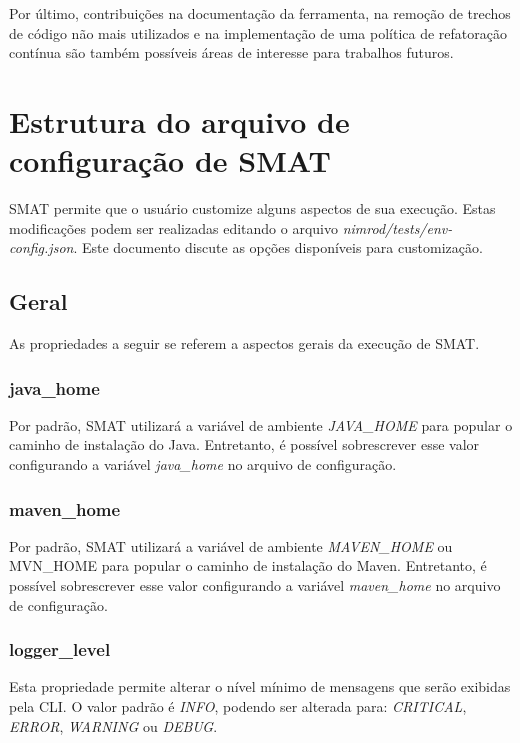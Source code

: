 \documentclass[12pt]{article}
\begin{document}
Por último, contribuições na documentação da ferramenta, na remoção de trechos de código não mais utilizados e na implementação de uma política de refatoração contínua são também possíveis áreas de interesse para trabalhos futuros.




\newpage

\appendix
\section{Estrutura do arquivo de configuração de SMAT} \label{apendice-a}
SMAT permite que o usuário customize alguns aspectos de sua execução. Estas modificações podem ser realizadas editando o arquivo \textit{nimrod/tests/env-config.json}. Este documento discute as opções disponíveis para customização.

\subsection{Geral}
As propriedades a seguir se referem a aspectos gerais da execução de SMAT.

\subsubsection{java\_home}
Por padrão, SMAT utilizará a variável de ambiente \textit{JAVA\_HOME} para popular o caminho de instalação do Java. Entretanto, é possível sobrescrever esse valor configurando a variável \textit{java\_home} no arquivo de configuração.

\subsubsection{maven\_home}
Por padrão, SMAT utilizará a variável de ambiente \textit{MAVEN\_HOME} ou MVN\_HOME para popular o caminho de instalação do Maven. Entretanto, é possível sobrescrever esse valor configurando a variável \textit{maven\_home} no arquivo de configuração.

\subsubsection{logger\_level}
Esta propriedade permite alterar o nível mínimo de mensagens que serão exibidas pela CLI. O valor padrão é \textit{INFO}, podendo ser alterada para: \textit{CRITICAL}, \textit{ERROR}, \textit{WARNING} ou \textit{DEBUG}.
\end{document}
